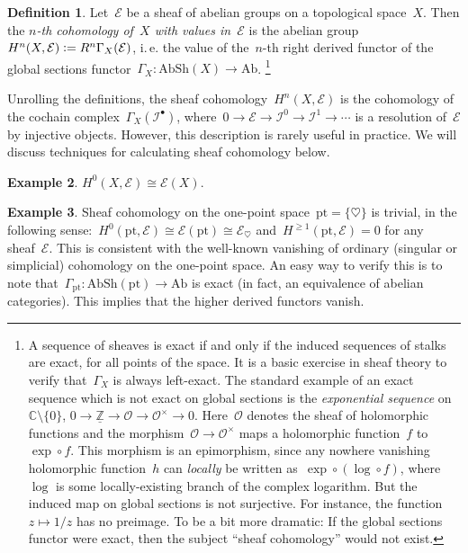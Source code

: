\documentclass[10pt]{amsart}
\makeatletter
\theoremstyle{definition}
\newtheorem{defn}{Definition}[section]
\newtheorem{ex}[defn]{Example}
\theoremstyle{plain}
\theoremstyle{remark}
\newcommand{\E}{\mathcal{E}}
\newcommand{\I}{\mathcal{I}}
\renewcommand{\O}{\mathcal{O}}
\newcommand{\ZZ}{\mathbb{Z}}
\newcommand{\CC}{\mathbb{C}}
\newcommand{\Ab}{\mathrm{Ab}}
\newcommand{\AbSh}{\mathrm{AbSh}}
\newcommand{\defeq}{\vcentcolon=}
\newcommand{\ie}{i.\,e.\@\xspace}
\newcommand{\pt}{\mathrm{pt}}
\makeatother
\begin{document}
\begin{defn}Let~$\E$ be a sheaf of abelian groups on a topological space~$X$.
Then the \emph{$n$-th cohomology of~$X$ with values in~$\E$} is the abelian
group $H^n(X, \E) \defeq R^n\Gamma_X(\E)$, \ie the value of the~$n$-th right
derived functor of the global sections functor~$\Gamma_X : \AbSh(X) \to \Ab$.%
\footnote{A sequence of sheaves is exact if and only if the induced sequences of
stalks are exact, for all points of the space. It is a basic exercise in sheaf
theory to verify that~$\Gamma_X$ is always left-exact. The standard example of
an exact sequence which is not exact on global sections is the
\emph{exponential sequence} on~$\CC \setminus \{0\}$, $0 \to \underline{\ZZ} \to \O \to
\O^\times \to 0$. Here~$\O$ denotes the sheaf of holomorphic functions and the
morphism~$\O \to \O^\times$ maps a holomorphic function~$f$ to~$\exp \circ f$.
This morphism is an epimorphism, since any nowhere vanishing holomorphic
function~$h$ can \emph{locally} be written as~$\exp \circ (\log \circ f)$,
where~$\log$ is some locally-existing branch of the complex logarithm. But the
induced map on global sections is not surjective. For instance, the function~$z
\mapsto 1/z$ has no preimage. To be a bit more dramatic: If the global sections
functor were exact, then the subject ``sheaf cohomology'' would not
exist.}
\end{defn}

Unrolling the definitions, the sheaf cohomology~$H^n(X,\E)$ is the cohomology
of the cochain complex~$\Gamma_X(\I^\bullet)$, where~$0 \to \E \to \I^0 \to \I^1
\to \cdots$ is a resolution of~$\E$ by injective objects. However, this
description is rarely useful in practice. We will discuss techniques for
calculating sheaf cohomology below.

\begin{ex}$H^0(X,\E) \cong \E(X)$.\end{ex}

\begin{ex}Sheaf cohomology on the one-point space~$\pt = \{ \heartsuit \}$ is
trivial, in the following sense:~$H^0(\pt,\E) \cong \E(\pt) \cong \E_\heartsuit$
and~$H^{\geq 1}(\pt,\E) = 0$ for any sheaf~$\E$. This is consistent with the
well-known vanishing of ordinary (singular or simplicial) cohomology on the
one-point space. An easy way to verify this is to note that~$\Gamma_\pt :
\AbSh(\pt) \to \Ab$ is exact (in fact, an equivalence of abelian categories).
This implies that the higher derived functors vanish.\end{ex}
\end{document}
